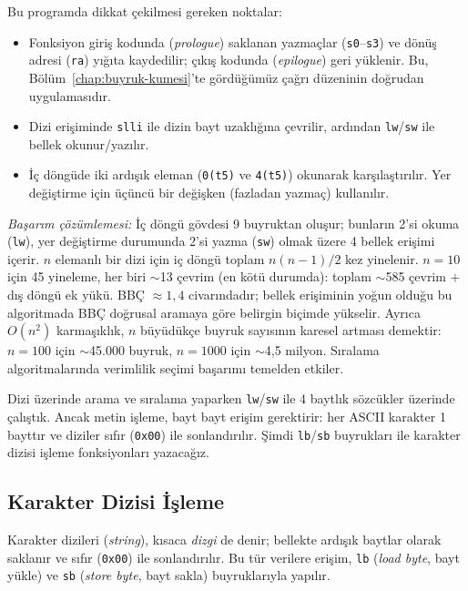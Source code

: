 \begin{ornek}[4.8]
Bu programda dikkat çekilmesi gereken noktalar:
\begin{itemize}
\item Fonksiyon giriş kodunda (\emph{prologue}) saklanan yazmaçlar (\texttt{s0}--\texttt{s3}) ve dönüş adresi (\texttt{ra}) yığıta kaydedilir; çıkış kodunda (\emph{epilogue}) geri yüklenir. Bu, Bölüm~\ref{chap:buyruk-kumesi}'te gördüğümüz çağrı düzeninin doğrudan uygulamasıdır.
\item Dizi erişiminde \texttt{slli} ile dizin bayt uzaklığına çevrilir, ardından \texttt{lw}/\texttt{sw} ile bellek okunur/yazılır.
\item İç döngüde iki ardışık eleman (\texttt{0(t5)} ve \texttt{4(t5)}) okunarak karşılaştırılır. Yer değiştirme için üçüncü bir değişken (fazladan yazmaç) kullanılır.
\end{itemize}

\emph{Başarım çözümlemesi:} İç döngü gövdesi 9 buyruktan oluşur; bunların 2'si okuma (\texttt{lw}), yer değiştirme durumunda 2'si yazma (\texttt{sw}) olmak üzere 4 bellek erişimi içerir. $n$ elemanlı bir dizi için iç döngü toplam $n(n-1)/2$ kez yinelenir. $n = 10$ için 45 yineleme, her biri $\sim$13 çevrim (en kötü durumda): toplam $\sim$585 çevrim $+$ dış döngü ek yükü. BBÇ $\approx 1{,}4$ civarındadır; bellek erişiminin yoğun olduğu bu algoritmada BBÇ doğrusal aramaya göre belirgin biçimde yükselir. Ayrıca $O(n^2)$ karmaşıklık, $n$ büyüdükçe buyruk sayısının karesel artması demektir: $n = 100$ için $\sim$45.000 buyruk, $n = 1000$ için $\sim$4{,}5 milyon. Sıralama algoritmalarında verimlilik seçimi başarımı temelden etkiler.
\end{ornek}


Dizi üzerinde arama ve sıralama yaparken \texttt{lw}/\texttt{sw} ile 4 baytlık sözcükler üzerinde çalıştık. Ancak metin işleme, bayt bayt erişim gerektirir: her ASCII karakter 1 bayttır ve diziler sıfır (\texttt{0x00}) ile sonlandırılır. Şimdi \texttt{lb}/\texttt{sb} buyrukları ile karakter dizisi işleme fonksiyonları yazacağız.

\subsection{Karakter Dizisi İşleme}
\label{subsec:karakter-dizisi}

Karakter dizileri (\emph{string}), kısaca \emph{dizgi} de denir; bellekte ardışık baytlar olarak saklanır ve sıfır (\texttt{0x00}) ile sonlandırılır. Bu tür verilere erişim, \texttt{lb} (\emph{load byte}, bayt yükle) ve \texttt{sb} (\emph{store byte}, bayt sakla) buyruklarıyla yapılır.


